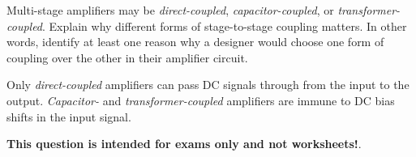 

Multi-stage amplifiers may be {\it direct-coupled}, {\it capacitor-coupled}, or {\it transformer-coupled}.  Explain why different forms of stage-to-stage coupling matters.  In other words, identify at least one reason why a designer would choose one form of coupling over the other in their amplifier circuit.







Only {\it direct-coupled} amplifiers can pass DC signals through from the input to the output.  {\it Capacitor-} and {\it transformer-coupled} amplifiers are immune to DC bias shifts in the input signal.







{\bf This question is intended for exams only and not worksheets!}.



